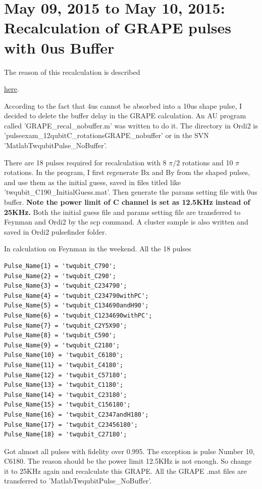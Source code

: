 \clearpage
\section{May 09, 2015 to May 10, 2015: Recalculation of GRAPE pulses with 0us Buffer}

{}

\hypertarget{reason:pulse_no_buffer}{The reason of this recalculation is described} 
\hyperlink{found:pulse_no_buffer}{here}.

According to the fact that 4us cannot be absorbed into a 10us shape pulse, I decided to delete the buffer delay in the GRAPE calculation. An AU program called 'GRAPE\_recal\_nobuffer.m' was written to do it. The directory in Ordi2 is '\dir pulseexam\_12qubit\dir C\_rotations\dir GRAPE\_nobuffer\dir' or in the SVN '\dir Matlab\dir Twqubit\dir Pulse\_NoBuffer\dir'.

There are 18 pulses required for recalculation with 8 $\pi/2$ rotations and 10 $\pi$ rotations. In the program, I first regenerate Bx and By from the shaped pulses, and use them as the initial guess, saved in files titled like 'twqubit\_C190\_InitialGuess.mat'. Then generate the params setting file with 0us buffer. \textbf{Note the power limit of C channel is set as 12.5KHz instead of 25KHz. }Both the initial guess file and params setting file are transferred to Feynman and Ordi2 by the scp command. A cluster sample is also written and saved in Ordi2 pulsefinder folder.

In calculation on Feynman in the weekend. All the 18 pulses
\begin{lstlisting}
Pulse_Name{1} = 'twqubit_C790';
Pulse_Name{2} = 'twqubit_C290';
Pulse_Name{3} = 'twqubit_C234790';
Pulse_Name{4} = 'twqubit_C234790withPC';
Pulse_Name{5} = 'twqubit_C134690andH90';
Pulse_Name{6} = 'twqubit_C1234690withPC';
Pulse_Name{7} = 'twqubit_C2Y5X90';
Pulse_Name{8} = 'twqubit_C590';
Pulse_Name{9} = 'twqubit_C2180';
Pulse_Name{10} = 'twqubit_C6180';
Pulse_Name{11} = 'twqubit_C4180';
Pulse_Name{12} = 'twqubit_C57180';
Pulse_Name{13} = 'twqubit_C1180';
Pulse_Name{14} = 'twqubit_C23180';
Pulse_Name{15} = 'twqubit_C156180';
Pulse_Name{16} = 'twqubit_C2347andH180';
Pulse_Name{17} = 'twqubit_C23456180';
Pulse_Name{18} = 'twqubit_C27180';
\end{lstlisting}

Got almost all pulses with fidelity over 0.995. The exception is pulse Number 10, C6180. The reason should be the power limit 12.5KHz is not enough. So change it to 25KHz again and recalculate this GRAPE. All the GRAPE .mat files are transferred to '\dir Matlab\dir Twqubit\dir Pulse\_NoBuffer\dir'.

